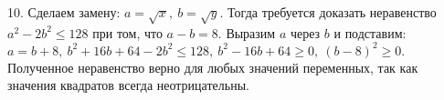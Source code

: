 10. Сделаем замену: $a=\sqrt{x},\ b=\sqrt{y}.$ Тогда требуется доказать неравенство $a^2-2b^2\leqslant 128$ при том, что $a-b=8.$ Выразим $a$ через $b$ и подставим:
$a=b+8,\ b^2+16b+64-2b^2\leqslant 128,\ b^2-16b+64\geqslant0,\ (b-8)^2\geqslant0.$ Полученное неравенство верно для любых значений переменных, так как значения квадратов всегда неотрицательны.\\
